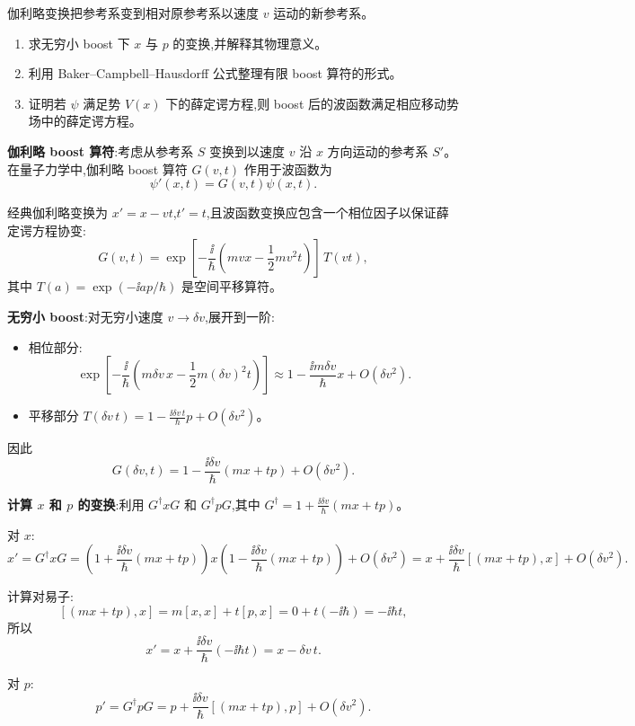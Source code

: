 \begin{question}
伽利略变换把参考系变到相对原参考系以速度 $v$ 运动的新参考系。
\begin{enumerate}
\item 求无穷小 boost 下 $x$ 与 $p$ 的变换,并解释其物理意义。
\item 利用 Baker--Campbell--Hausdorff 公式整理有限 boost 算符的形式。
\item 证明若 $\psi$ 满足势 $V(x)$ 下的薛定谔方程,则 boost 后的波函数满足相应移动势场中的薛定谔方程。
\end{enumerate}
\end{question}
\begin{solution}
	\textbf{伽利略 boost 算符}:考虑从参考系 $S$ 变换到以速度 $v$ 沿 $x$ 方向运动的参考系 $S'$。在量子力学中,伽利略 boost 算符 $G(v,t)$ 作用于波函数为
	\[
	\psi'(x,t) = G(v,t)\psi(x,t).
	\]

	经典伽利略变换为 $x'=x-vt$,$t'=t$,且波函数变换应包含一个相位因子以保证薛定谔方程协变:
	\[
	G(v,t) = \exp\!\left[-\frac{\ii}{\hbar}\left(mvx - \frac12 mv^2 t\right)\right]\,T(vt),
	\]
	其中 $T(a)=\exp(-\ii a p/\hbar)$ 是空间平移算符。

	\textbf{无穷小 boost}:对无穷小速度 $v\to\delta v$,展开到一阶:
	\begin{itemize}
	\item 相位部分:
	\[
	\exp\!\left[-\frac{\ii}{\hbar}\left(m\delta v\,x - \frac12 m(\delta v)^2 t\right)\right]
	\approx 1 - \frac{\ii m\delta v}{\hbar}x + O(\delta v^2).
	\]
	\item 平移部分 $T(\delta v\,t) = 1 - \frac{\ii\delta v\,t}{\hbar}p + O(\delta v^2)$。
	\end{itemize}

	因此
	\[
	G(\delta v,t) = 1 - \frac{\ii\delta v}{\hbar}(mx + tp) + O(\delta v^2).
	\]

	\textbf{计算 $x$ 和 $p$ 的变换}:利用 $G^\dagger x G$ 和 $G^\dagger p G$,其中 $G^\dagger = 1 + \frac{\ii\delta v}{\hbar}(mx+tp)$。

	对 $x$:
	\[
	x' = G^\dagger x G
	= \left(1+\frac{\ii\delta v}{\hbar}(mx+tp)\right) x \left(1-\frac{\ii\delta v}{\hbar}(mx+tp)\right) + O(\delta v^2)
	= x + \frac{\ii\delta v}{\hbar}[(mx+tp),x] + O(\delta v^2).
	\]

	计算对易子:
	\[
	[(mx+tp),x] = m[x,x] + t[p,x] = 0 + t(-\ii\hbar) = -\ii\hbar t,
	\]
	所以
	\[
	x' = x + \frac{\ii\delta v}{\hbar}(-\ii\hbar t) = x - \delta v\,t.
	\]

	对 $p$:
	\[
	p' = G^\dagger p G = p + \frac{\ii\delta v}{\hbar}[(mx+tp),p] + O(\delta v^2).
	\]


\end{solution}
